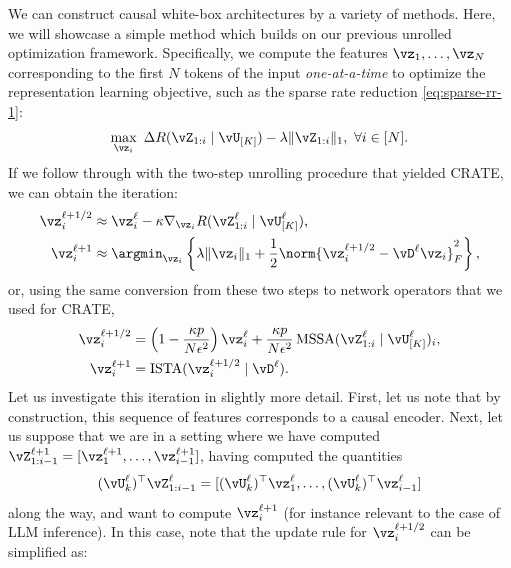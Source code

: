 \documentclass[../../book-main.tex]{subfiles}
\begin{document}
We can construct causal white-box architectures by a variety of
methods. Here, we will showcase a simple method which builds on our
previous unrolled optimization framework. Specifically, we compute
the features \(\vz_{1}, \dots, \vz_{N}\) corresponding to the first
\(N\) tokens of the input \textit{one-at-a-time} to optimize the
representation learning objective, such as the sparse rate reduction
\eqref{eq:sparse-rr-1}:
\begin{equation}
    \max_{\vz_{i}}\ \Delta R(\vZ_{1:i} \mid \vU_{[K]}) - \lambda
    \|\vZ_{1:i}\|_{1},\ \forall i \in [N].
\end{equation}
If we follow through with the two-step unrolling procedure that
yielded CRATE, we can obtain the iteration:
\begin{align}
    \vz_{i}^{\ell + 1/2} &\approx \vz_{i}^{\ell} - \kappa
    \nabla_{\vz_{i}} R(\vZ_{1:i}^{\ell} \mid \vU_{[K]}^{\ell}), \\
    \vz_{i}^{\ell + 1} &\approx \argmin_{\vz_{i}} \left\{\lambda
        \|\vz_{i}\|_{1} + \frac{1}{2}\norm{\vz_{i}^{\ell + 1/2} -
    \vD^{\ell} {\vz_{i}}}_F^2\right\},
\end{align}
or, using the same conversion from these two steps to network
operators that we used for CRATE,
\begin{align}
    \vz_{i}^{\ell + 1/2}
    &= \left(1 - \frac{\kappa p}{N\epsilon^{2}}\right)\vz_{i}^{\ell}
    + \frac{\kappa p}{N
    \epsilon^{2}}\operatorname{MSSA}(\vZ_{1:i}^{\ell} \mid
    \vU_{[K]}^{\ell})_{i}, \\
    \vz_{i}^{\ell + 1}
    &= \operatorname{ISTA}(\vz_{i}^{\ell + 1/2} \mid \vD^{\ell}).
\end{align}
Let us investigate this iteration in slightly more detail. First, let
us note that by construction, this sequence of features corresponds
to a causal encoder. Next, let us suppose that we are in a setting
where we have computed \(\vZ_{1:i-1}^{\ell + 1} = [\vz_{1}^{\ell +
1}, \dots, \vz_{i-1}^{\ell + 1}]\), having computed the quantities
\begin{equation}
    (\vU_{k}^{\ell})^{\top}\vZ_{1:i-1}^{\ell} =
    [(\vU_{k}^{\ell})^{\top}\vz_{1}^{\ell}, \dots,
    (\vU_{k}^{\ell})^{\top}\vz_{i-1}^{\ell}]
\end{equation}
along the way, and want to compute \(\vz_{i}^{\ell + 1}\) (for
instance relevant to the case of LLM inference). In this case, note
that the update rule for \(\vz_{i}^{\ell + 1/2}\) can be simplified as:
\end{document}
